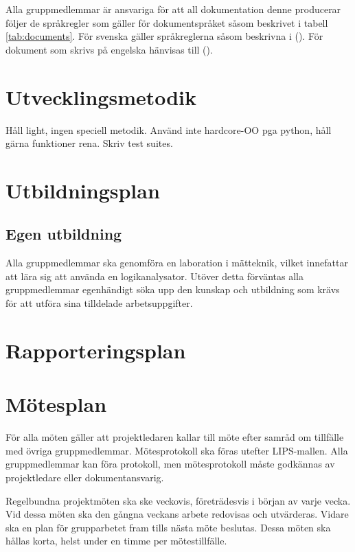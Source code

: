 \documentclass[a4paper,11pt]{article}
\begin{document}
    Alla gruppmedlemmar är ansvariga för att all dokumentation denne producerar följer de språkregler som gäller för dokumentspråket såsom beskrivet i tabell \ref{tab:documents}. För svenska gäller språkreglerna såsom beskrivna i  (\cite{Sprakradet2008}). För dokument som skrivs på engelska hänvisas till  (\cite{Ritter2003}).
    
    \label{tab:documents}
    \section{Utvecklingsmetodik}
    
    Håll light, ingen speciell metodik. Använd inte hardcore-OO pga python, håll gärna funktioner rena. Skriv test suites.
    
    \section{Utbildningsplan}
    \subsection{Egen utbildning}
    Alla gruppmedlemmar ska genomföra en laboration i mätteknik, vilket innefattar att lära sig att använda en logikanalysator. Utöver detta förväntas alla gruppmedlemmar egenhändigt söka upp den kunskap och utbildning som krävs för att utföra sina tilldelade arbetsuppgifter.
    
    \section{Rapporteringsplan}
    
    \section{Mötesplan}
    För alla möten gäller att projektledaren kallar till möte efter samråd om tillfälle med övriga gruppmedlemmar. Mötesprotokoll ska föras utefter LIPS-mallen. Alla gruppmedlemmar kan föra protokoll, men mötesprotokoll måste godkännas av projektledare eller dokumentansvarig.
    
    Regelbundna projektmöten ska ske veckovis, företrädesvis i början av varje vecka. Vid dessa möten ska den gångna veckans arbete redovisas och utvärderas. Vidare ska en plan för grupparbetet fram tills nästa möte beslutas. Dessa möten ska hållas korta, helst under en timme per mötestillfälle. 
    
\end{document}

